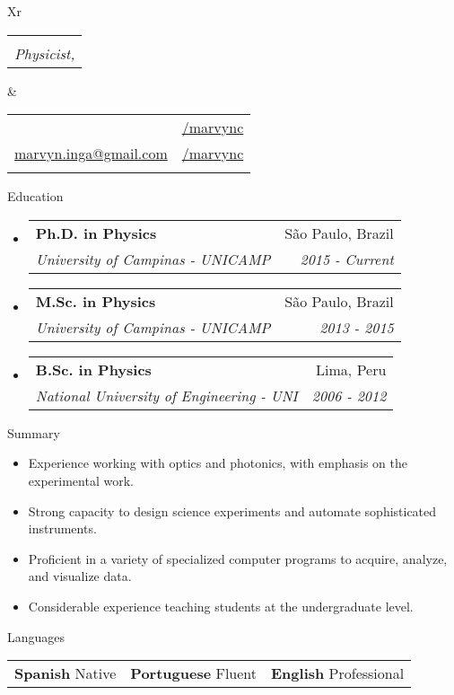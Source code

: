 \documentclass[letterpaper, 11pt]{article}[leftmargin=*]
\makeatletter
\def \fullname {\Huge Marvyn Inga}
\def \subtitle {Physicist, \faMale}
\def \linkedinicon {\faLinkedin}
\def \linkedinlink {https://www.linkedin.com/in/marvync/}
\def \linkedintext {/marvync}
\def \phoneicon {\faPhone}
\def \phonetext {+55-21-975106507}
\def \emailicon {\faEnvelope}
\def \emaillink {mailto:marvyn.inga@gmail.com}
\def \emailtext {marvyn.inga@gmail.com}
\def \githubicon {\faGithub}
\def \githublink {https://github.com/marvync}
\def \githubtext {/marvync}
\def \headertype {\doublecol} %
\def \linkedin {\linkedinicon \hspace{3pt}\href{\linkedinlink}{\linkedintext}}
\def \phone {\phoneicon \hspace{3pt}{ \phonetext}}
\def \email {\emailicon \hspace{3pt}\href{\emaillink}{\emailtext}}
\def \github {\githubicon \hspace{3pt}\href{\githublink}{\githubtext}}
\renewcommand{\section}[2]{
  \colorbox{boxcol}{\color{secondary}\raggedbottom\normalsize{#1}{\hspace{2pt}#2}}
}
\newcommand{\resumeEntryStart}{\begin{itemize}[leftmargin=2.5mm]\itemsep8pt}
\newcommand{\resumeEntryEnd}{\end{itemize}}
\newcommand{\resumeItemListStart}{\begin{itemize}[leftmargin=4.5mm]\itemsep-3pt}
\newcommand{\resumeItemListEnd}{\end{itemize}}
\newcommand{\resumeItem}[1]{
  \item\small{
    {#1}
  }
}
\newcommand{\resumeEntryTSDL}[4]{
  \item[]
    \begin{tabularx}{0.98\textwidth}{X@{\hspace{60pt}}r}
      \textbf{\color{primary}#1} & {\firabook\color{accent}\small#2} \\
      \vspace{-0.35cm}
      \textit{\color{accent}\small#3} & \textit{\color{accent}\small#4} \\
    \end{tabularx}\vspace{-0.35cm}
}
\newcommand{\resumeEntryS}[2]{
  \item[]\small{
    \textbf{\color{primary}#1 }{ #2 }
  }
}
\newcommand{\triplecol}[3]{
	\vspace{-0.3cm}
	\begin{tabularx}{\textwidth}{XXX}
	{\small#1} & {\small#2} & {\small#3}
	\end{tabularx}
}
\newcommand{\doublecol}[6]{
  \begin{tabularx}{\textwidth}{Xr}
    {
      \begin{tabular}[c]{l}
        \fontsize{35}{45}\selectfont{\color{primary}{{\textbf{\fullname}}}} \\
        {\textit{\subtitle}} %
      \end{tabular}
    } & {
      \begin{tabular}[c]{l@{\hspace{1.5em}}l}
        {\small#4} & {\small#1} \\
        {\small#5} & {\small#2} \\
        {\small#6} & {\small#3}
      \end{tabular}
    }
  \end{tabularx}
\vspace{0.3cm}
}
\newcommand{\singlecol}[6]{
  \begin{tabularx}{\textwidth}{Xr}
    {
      \begin{tabular}[b]{l}
        \fontsize{35}{45}\selectfont{\color{primary}{{\textbf{\fullname}}}} \\
        {\textit{\subtitle}} %
      \end{tabular}
    } & {
      \begin{tabular}[c]{l}
        {\small#1} \\
        {\small#2} \\
        {\small#3} \\
        {\small#4} \\
        {\small#5} \\
        {\small#6}
      \end{tabular}
    }
  \end{tabularx}
}
\makeatother
\begin{document}


\headertype{\linkedin}{\github}{}{\phone}{\email}{} %

\section{\faGraduationCap}{Education}
\resumeEntryStart
	\small
	\resumeEntryTSDL
    {Ph.D. in Physics}{São Paulo, Brazil}
	{\footnotesize University of Campinas - UNICAMP}{\footnotesize 2015 - Current}
	\resumeEntryTSDL
	{M.Sc. in Physics}{São Paulo, Brazil}
	{\footnotesize University of Campinas - UNICAMP}{\footnotesize 2013 - 2015}
	\resumeEntryTSDL
	{B.Sc. in Physics}{Lima, Peru}
	{\footnotesize National University of Engineering - UNI}{\footnotesize 2006 - 2012}
\resumeEntryEnd
\vspace{0.1cm}
\section{\faFolderOpen}{Summary}
\resumeItemListStart
\resumeItem {Experience working with optics and photonics, with emphasis on the experimental work.}
\resumeItem {Strong capacity to design science experiments and automate sophisticated instruments.}
\resumeItem {Proficient in a variety of specialized computer programs to acquire, analyze, and visualize data.}
\resumeItem {Considerable experience teaching students at the undergraduate level.}
\resumeItemListEnd

\section{\faComment}{Languages}
\vspace{-0.2cm}
\resumeEntryStart
	\small
	\triplecol{\resumeEntryS{Spanish}{Native}}{\resumeEntryS{Portuguese}{Fluent}}{\resumeEntryS{English} {Professional}}
\resumeEntryEnd
\end{document}
